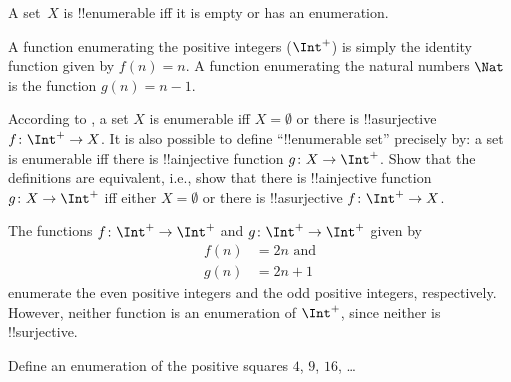 \documentclass[../../../include/open-logic-section]{subfiles}
\begin{document}
\begin{defn}
  A set~$X$ is !!{enumerable} iff it is empty or has an enumeration.
\end{defn}

\begin{ex}
A function enumerating the positive integers ($\Int^+$) is simply the
identity function given by $f(n) = n$. A function enumerating the
natural numbers $\Nat$ is the function $g(n) = n - 1$.
\end{ex}

\begin{prob}
  According to , a set $X$ is
  enumerable iff $X = \emptyset$ or there is !!a{surjective} $f\colon
  \Int^+ \to X$.  It is also possible to define ``!!{enumerable} set''
  precisely by: a set is enumerable iff there is !!a{injective}
  function $g\colon X \to \Int^+$.  Show that the definitions are
  equivalent, i.e., show that there is !!a{injective} function
  $g\colon X \to \Int^+$ iff either $X = \emptyset$ or there is
  !!a{surjective} $f\colon \Int^+ \to X$.
\end{prob}

\begin{ex}
The functions $f\colon \Int^+ \to \Int^+$ and $g \colon \Int^+ \to
\Int^+$ given by
\begin{align*}
f(n) & = 2n \text{ and}\\
g(n) & = 2n+1
\end{align*}
enumerate the even positive integers and the odd positive integers,
respectively. However, neither function is an enumeration of
$\Int^+$, since neither is !!{surjective}.
\end{ex}

\begin{prob}
Define an enumeration of the positive squares $4$, $9$, $16$, \dots
\end{prob}
\end{document}
